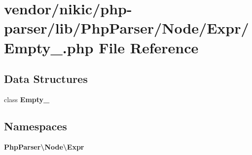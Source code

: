 \section{vendor/nikic/php-\/parser/lib/\+Php\+Parser/\+Node/\+Expr/\+Empty\+\_\+.php File Reference}
\label{_empty___8php}
\subsection*{Data Structures}
\begin{DoxyCompactItemize}
\item 
class {\bf Empty\+\_\+}
\end{DoxyCompactItemize}
\subsection*{Namespaces}
\begin{DoxyCompactItemize}
\item 
 {\bf Php\+Parser\textbackslash{}\+Node\textbackslash{}\+Expr}
\end{DoxyCompactItemize}
